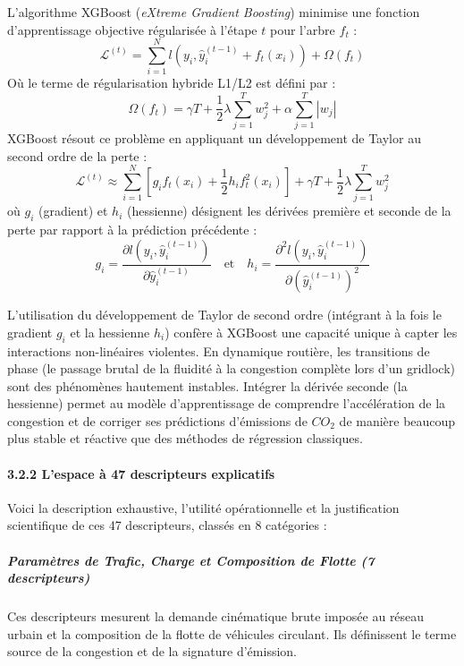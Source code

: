 \documentclass[10pt, a4paper]{article}
\begin{document}
L'algorithme XGBoost (\emph{eXtreme Gradient Boosting}) minimise une
fonction d'apprentissage objective régularisée à l'étape \(t\) pour
l'arbre \(f_t\) :
\[\mathcal{L}^{(t)} = \sum_{i=1}^N l\left(y_i, \hat{y}_i^{(t-1)} + f_t(x_i)\right) + \Omega(f_t)\]
Où le terme de régularisation hybride L1/L2 est défini par :
\[\Omega(f_t) = \gamma T + \frac{1}{2} \lambda \sum_{j=1}^T w_j^2 + \alpha \sum_{j=1}^T |w_j|\]
XGBoost résout ce problème en appliquant un développement de Taylor au
second ordre de la perte :
\[\mathcal{L}^{(t)} \approx \sum_{i=1}^N \left[ g_i f_t(x_i) + \frac{1}{2} h_i f_t^2(x_i) \right] + \gamma T + \frac{1}{2} \lambda \sum_{j=1}^T w_j^2\]
où \(g_i\) (gradient) et \(h_i\) (hessienne) désignent les dérivées
première et seconde de la perte par rapport à la prédiction précédente :
\[g_i = \frac{\partial l\left(y_i, \hat{y}_i^{(t-1)}\right)}{\partial \hat{y}_i^{(t-1)}} \quad \text{et} \quad h_i = \frac{\partial^2 l\left(y_i, \hat{y}_i^{(t-1)}\right)}{\partial \left(\hat{y}_i^{(t-1)}\right)^2}\]

L'utilisation du développement de Taylor de second ordre (intégrant à la
fois le gradient \(g_i\) et la hessienne \(h_i\)) confère à XGBoost une
capacité unique à capter les interactions non-linéaires violentes. En
dynamique routière, les transitions de phase (le passage brutal de la
fluidité à la congestion complète lors d'un gridlock) sont des
phénomènes hautement instables. Intégrer la dérivée seconde (la
hessienne) permet au modèle d'apprentissage de comprendre l'accélération
de la congestion et de corriger ses prédictions d'émissions de \(CO_2\)
de manière beaucoup plus stable et réactive que des méthodes de
régression classiques.

\paragraph{3.2.2 L'espace à 47 descripteurs
explicatifs}\label{lespace-uxe0-47-descripteurs-explicatifs}

Voici la description exhaustive, l'utilité opérationnelle et la
justification scientifique de ces 47 descripteurs, classés en 8
catégories :

\subparagraph{Paramètres de Trafic, Charge et Composition de Flotte (7
descripteurs)}\label{paramuxe8tres-de-trafic-charge-et-composition-de-flotte-7-descripteurs}

Ces descripteurs mesurent la demande cinématique brute imposée au réseau
urbain et la composition de la flotte de véhicules circulant. Ils
définissent le terme source de la congestion et de la signature
d'émission.
\end{document}
